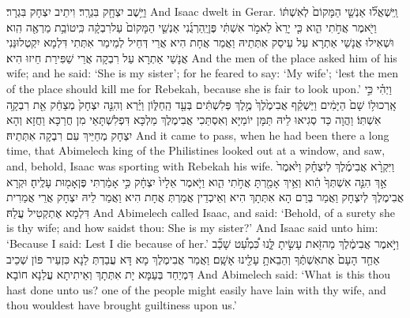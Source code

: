 {וַיֵּ֥שֶׁב יִצְחָ֖ק בִּגְרָֽר׃}
{וִיתֵיב יִצְחָק בִּגְרָר׃}
{And Isaac dwelt in Gerar.}{}
{וַֽיִּשְׁאֲל֞וּ אַנְשֵׁ֤י הַמָּקוֹם֙ לְאִשְׁתּ֔וֹ וַיֹּ֖אמֶר אֲחֹ֣תִי הִ֑וא כִּ֤י יָרֵא֙ לֵאמֹ֣ר אִשְׁתִּ֔י פֶּן\maqqaf יַֽהַרְגֻ֜נִי אַנְשֵׁ֤י הַמָּקוֹם֙ עַל\maqqaf רִבְקָ֔ה כִּֽי\maqqaf טוֹבַ֥ת מַרְאֶ֖ה הִֽוא׃}
{וּשְׁאִילוּ אֲנָשֵׁי אַתְרָא עַל עֵיסַק אִתְּתֵיהּ וַאֲמַר אֲחָת הִיא אֲרֵי דְּחֵיל לְמֵימַר אִתְּתִי דִּלְמָא יִקְטְלוּנַּנִי אֲנָשֵׁי אַתְרָא עַל רִבְקָה אֲרֵי שַׁפִּירַת חֵיזוּ הִיא׃}
{And the men of the place asked him of his wife; and he said: ‘She is my sister’; for he feared to say: ‘My wife’; ‘lest the men of the place should kill me for Rebekah, because she is fair to look upon.’}{}
{וַיְהִ֗י כִּ֣י אָֽרְכוּ\maqqaf ל֥וֹ שָׁם֙ הַיָּמִ֔ים וַיַּשְׁקֵ֗ף אֲבִימֶ֙לֶךְ֙ מֶ֣לֶךְ פְּלִשְׁתִּ֔ים בְּעַ֖ד הַֽחַלּ֑וֹן וַיַּ֗רְא וְהִנֵּ֤ה יִצְחָק֙ מְצַחֵ֔ק אֵ֖ת רִבְקָ֥ה אִשְׁתּֽוֹ׃}
{וַהֲוָה כַּד סְגִיאוּ לֵיהּ תַּמָּן יוֹמַיָּא וְאִסְתַּכִי אֲבִימֶלֶךְ מַלְכָּא דִּפְלִשְׁתָּאֵי מִן חֲרַכָּא וַחֲזָא וְהָא יִצְחָק מְחַיֵּיךְ עִם רִבְקָה אִתְּתֵיהּ׃}
{And it came to pass, when he had been there a long time, that Abimelech king of the Philistines looked out at a window, and saw, and, behold, Isaac was sporting with Rebekah his wife.}{}
{וַיִּקְרָ֨א אֲבִימֶ֜לֶךְ לְיִצְחָ֗ק וַיֹּ֙אמֶר֙ אַ֣ךְ הִנֵּ֤ה אִשְׁתְּךָ֙ הִ֔וא וְאֵ֥יךְ אָמַ֖רְתָּ אֲחֹ֣תִי הִ֑וא וַיֹּ֤אמֶר אֵלָיו֙ יִצְחָ֔ק כִּ֣י אָמַ֔רְתִּי פֶּן\maqqaf אָמ֖וּת עָלֶֽיהָ׃}
{וּקְרָא אֲבִימֶלֶךְ לְיִצְחָק וַאֲמַר בְּרַם הָא אִתְּתָךְ הִיא וְאֵיכְדֵין אֲמַרְתְּ אֲחָת הִיא וַאֲמַר לֵיהּ יִצְחָק אֲרֵי אֲמַרִית דִּלְמָא אֶתְקְטִיל עֲלַהּ׃}
{And Abimelech called Isaac, and said: ‘Behold, of a surety she is thy wife; and how saidst thou: She is my sister?’ And Isaac said unto him: ‘Because I said: Lest I die because of her.’}{}
{וַיֹּ֣אמֶר אֲבִימֶ֔לֶךְ מַה\maqqaf זֹּ֖את עָשִׂ֣יתָ לָּ֑נוּ כִּ֠מְעַ֠ט שָׁכַ֞ב אַחַ֤ד הָעָם֙ אֶת\maqqaf אִשְׁתֶּ֔ךָ וְהֵבֵאתָ֥ עָלֵ֖ינוּ אָשָֽׁם׃}
{וַאֲמַר אֲבִימֶלֶךְ מָא דָּא עֲבַדְתְּ לַנָא כִּזְעֵיר פּוֹן שְׁכֵיב דִּמְיַחַד בְּעַמָּא יָת אִתְּתָךְ וְאֵיתִיתָא עֲלַנָא חוֹבָא׃}
{And Abimelech said: ‘What is this thou hast done unto us? one of the people might easily have lain with thy wife, and thou wouldest have brought guiltiness upon us.’}{}
